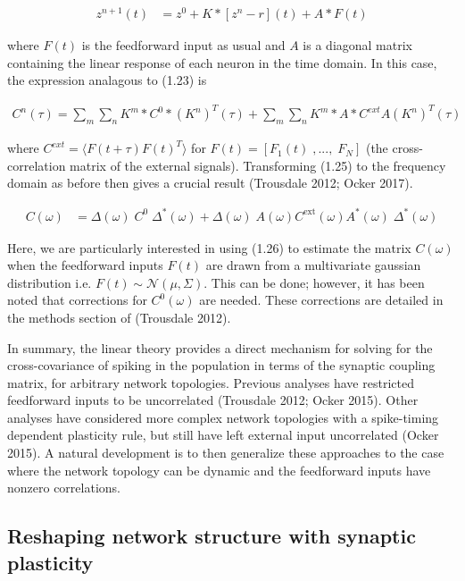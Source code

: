 \documentclass{ucetd}
\begin{document}
\begin{align}
z^{n+1}(t) &= z^{0} + K*[z^{n}-r](t) + A*F(t)
\end{align} 

where $F(t)$ is the feedforward input as usual and $A$ is a diagonal matrix containing the linear response of each neuron in the time domain. In this case, the expression analagous to (1.23) is 

\begin{align}
C^{n}(\tau) = \sum_{m}\sum_{n} K^{m}*C^{0}*(K^{n})^{T}(\tau) + \sum_{m}\sum_{n} K^{m}*A*C^{ext}A(K^{n})^{T}(\tau)
\end{align} 

where $C^{ext} = \langle F(t+\tau)F(t)^{T}\rangle$ for $F(t) = [F_{1}(t)\;,...,\;F_{N}]$ (the cross-correlation matrix of the external signals). Transforming (1.25) to the frequency domain as before then gives a crucial result (Trousdale 2012; Ocker 2017). 


\begin{align}
C(\omega) &= \Delta(\omega)\;C^{0}\;\Delta^{*}(\omega) + \Delta(\omega)\;A(\omega)C^{\mathrm{ext}}(\omega)A^{*}(\omega)\;\Delta^{*}(\omega)
\end{align} 

Here, we are particularly interested in using (1.26) to estimate the matrix $C(\omega)$ when the feedforward inputs $F(t)$ are drawn from a multivariate gaussian distribution i.e. $F(t) \sim \mathcal{N}(\mu,\Sigma)$. This can be done; however, it has been noted that corrections for $C^{0}(\omega)$ are needed. These corrections are detailed in the methods section of (Trousdale 2012).

In summary, the linear theory provides a direct mechanism for solving for the cross-covariance of spiking in the population in terms of the synaptic coupling matrix, for arbitrary network topologies. Previous analyses have restricted feedforward inputs to be uncorrelated (Trousdale 2012; Ocker 2015). Other analyses have considered more complex network topologies with a spike-timing dependent plasticity rule, but still have left external input uncorrelated (Ocker 2015). A natural development is to then generalize these approaches to the case where the network topology can be dynamic and the feedforward inputs have nonzero correlations.


\subsection{Reshaping network structure with synaptic plasticity}
\end{document}
